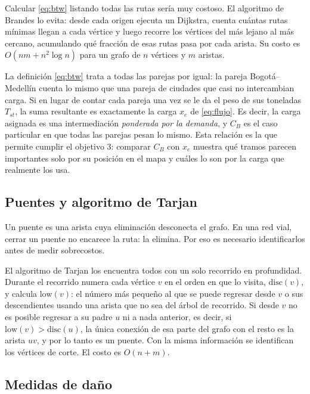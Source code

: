 \documentclass[conference]{IEEEtran}
\begin{document}
Calcular \eqref{eq:btw} listando todas las rutas sería muy costoso. El algoritmo
de Brandes \cite{brandes2001} lo evita: desde cada origen ejecuta un Dijkstra,
cuenta cuántas rutas mínimas llegan a cada vértice y luego recorre los vértices
del más lejano al más cercano, acumulando qué fracción de esas rutas pasa por
cada arista. Su costo es $O(nm+n^2\log n)$ para un grafo de $n$ vértices y $m$
aristas.

La definición \eqref{eq:btw} trata a todas las parejas por igual: la pareja
Bogotá--Medellín cuenta lo mismo que una pareja de ciudades que casi no
intercambian carga. Si en lugar de contar cada pareja una vez se le da el peso
de sus toneladas $T_{st}$, la suma resultante es exactamente la carga $x_e$ de
\eqref{eq:flujo}. Es decir, la carga asignada es una intermediación
\emph{ponderada por la demanda}, y $C_B$ es el caso particular en que todas las
parejas pesan lo mismo. Esta relación es la que permite cumplir el objetivo 3:
comparar $C_B$ con $x_e$ muestra qué tramos parecen importantes solo por su
posición en el mapa y cuáles lo son por la carga que realmente los usa.

\subsection{Puentes y algoritmo de Tarjan}
\label{sub:tarjan}

Un puente es una arista cuya eliminación desconecta el grafo. En una red vial,
cerrar un puente no encarece la ruta: la elimina. Por eso es necesario
identificarlos antes de medir sobrecostos.

El algoritmo de Tarjan \cite{tarjan1972} los encuentra todos con un solo
recorrido en profundidad. Durante el recorrido numera cada vértice $v$ en el
orden en que lo visita, $\text{disc}(v)$, y calcula $\text{low}(v)$: el número
más pequeño al que se puede regresar desde $v$ o sus descendientes usando una
arista que no sea del árbol de recorrido. Si desde $v$ no es posible regresar a
su padre $u$ ni a nada anterior, es decir, si
$\text{low}(v)>\text{disc}(u)$, la única conexión de esa parte del grafo con el
resto es la arista $uv$, y por lo tanto es un puente. Con la misma información
se identifican los vértices de corte. El costo es $O(n+m)$.

\subsection{Medidas de daño}
\label{sub:dano}
\end{document}

